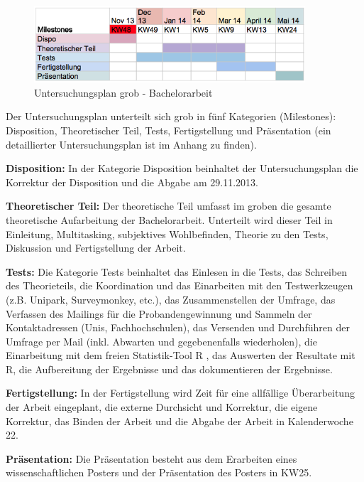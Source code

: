 \begin{figure}[H]
	\centering
	    \includegraphics[width=0.9\textwidth]
		{images/Untersuchungsplan_Grob.png}
	\caption{Untersuchungsplan grob - Bachelorarbeit}
	\label{fig.UntersuchungsplanGrob}
\end{figure}
Der Untersuchungsplan unterteilt sich grob in fünf Kategorien (Milestones): Disposition, Theoretischer Teil, Tests, Fertigstellung und Präsentation (ein detaillierter Untersuchungsplan ist im Anhang zu finden).\par
\textbf{Disposition:} In der Kategorie Disposition beinhaltet der Untersuchungsplan die Korrektur der Disposition und die Abgabe am 29.11.2013.\par
\textbf{Theoretischer Teil:} Der theoretische Teil umfasst im groben die gesamte theoretische Aufarbeitung der Bachelorarbeit. Unterteilt wird dieser Teil in Einleitung, Multitasking, subjektives Wohlbefinden, Theorie zu den Tests, Diskussion und Fertigstellung der Arbeit. \par
\textbf{Tests:} Die Kategorie Tests beinhaltet das Einlesen in die Tests, das Schreiben des Theorieteils, die Koordination und das Einarbeiten mit den Testwerkzeugen (z.B. Unipark, Surveymonkey, etc.), das Zusammenstellen der Umfrage, das Verfassen des Mailings für die Probandengewinnung und Sammeln der Kontaktadressen (Unis, Fachhochschulen), das Versenden und Durchführen der Umfrage per Mail (inkl. Abwarten und gegebenenfalls wiederholen), die Einarbeitung mit dem freien Statistik-Tool R \cite{Luhmann2013}, das Auswerten der Resultate mit R, die Aufbereitung der Ergebnisse und das dokumentieren der Ergebnisse.\par
\textbf{Fertigstellung:} In der Fertigstellung wird Zeit für eine allfällige Überarbeitung der Arbeit eingeplant, die externe Durchsicht und Korrektur, die eigene Korrektur, das Binden der Arbeit und die Abgabe der Arbeit in Kalenderwoche 22.\par
\textbf{Präsentation:} Die Präsentation besteht aus dem Erarbeiten eines wissenschaftlichen Posters und der Präsentation des Posters in KW25.\par
